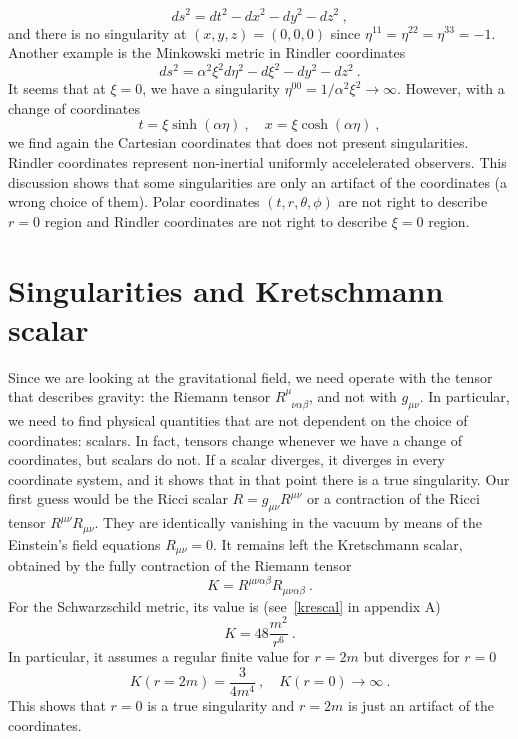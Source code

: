     \begin{equation*}
        ds^2 = dt^2 - dx^2 - dy^2 - dz^2 ~,
    \end{equation*}
    and there is no singularity at $(x,y,z) = (0,0,0)$ since $\eta^{11} = \eta^{22} = \eta^{33} = -1$. Another example is the Minkowski metric in Rindler coordinates 
    \begin{equation*}
        ds^2 = \alpha^2 \xi^2 d\eta^2 - d\xi^2 - dy^2 - dz^2 ~.
    \end{equation*}
    It seems that at $\xi = 0$, we have a singularity $\eta^{00} = 1 / \alpha^2 \xi^2 \rightarrow \infty$. However, with a change of coordinates   
    \begin{equation*}
        t = \xi \sinh(\alpha \eta) ~, \quad x = \xi \cosh (\alpha \eta) ~,
    \end{equation*}
    we find again the Cartesian coordinates that does not present singularities. Rindler coordinates represent non-inertial uniformly accelelerated observers. This discussion shows that some singularities are only an artifact of the coordinates (a wrong choice of them). Polar coordinates $(t,r,\theta,\phi)$ are not right to describe $r=0$ region and Rindler coordinates are not right to describe $\xi = 0$ region.

\section{Singularities and Kretschmann scalar}

    Since we are looking at the gravitational field, we need operate with the tensor that describes gravity: the Riemann tensor $R^{\mu}_{\phantom \mu \nu\alpha\beta}$, and not with $g_{\mu\nu}$. In particular, we need to find physical quantities that are not dependent on the choice of coordinates: scalars. In fact, tensors change whenever we have a change of coordinates, but scalars do not. If a scalar diverges, it diverges in every coordinate system, and it shows that in that point there is a true singularity. Our first guess would be the Ricci scalar $R = g_{\mu\nu} R^{\mu\nu}$ or a contraction of the Ricci tensor $R^{\mu\nu} R_{\mu\nu}$. They are identically vanishing in the vacuum by means of the Einstein's field equations $R_{\mu\nu} = 0$. It remains left the Kretschmann scalar, obtained by the fully contraction of the Riemann tensor 
    \begin{equation*}
        K = R^{\mu\nu\alpha\beta} R_{\mu\nu\alpha\beta} ~.
    \end{equation*}
    For the Schwarzschild metric, its value is (see~\eqref{krescal} in appendix A)
    \begin{equation*}
        K = 48 \frac{m^2}{r^6} ~.
    \end{equation*}
    In particular, it assumes a regular finite value for $r=2m$ but diverges for $r=0$
    \begin{equation*}
        K(r=2m) = \frac{3}{4 m^4} ~, \quad K(r=0) \rightarrow \infty ~.
    \end{equation*}
    This shows that $r=0$ is a true singularity and $r=2m$ is just an artifact of the coordinates.


